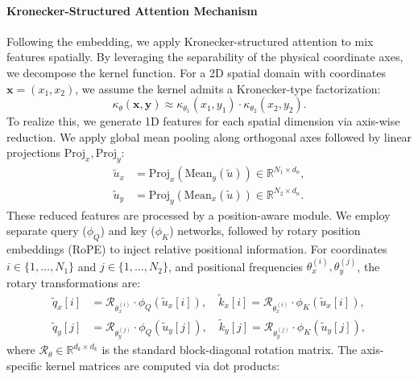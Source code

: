 \documentclass[final,3p,times]{elsarticle}
\begin{document}
\paragraph{Kronecker-Structured Attention Mechanism}
Following the embedding, we apply Kronecker-structured attention to mix features spatially. By leveraging the separability of the physical coordinate axes, we decompose the kernel function. For a 2D spatial domain with coordinates $\mathbf{x} = (x_1, x_2)$, we assume the kernel admits a Kronecker-type factorization:
\begin{equation}
\kappa_{\theta}(\mathbf{x}, \mathbf{y}) \approx \kappa_{\theta_1}(x_1, y_1) \cdot \kappa_{\theta_2}(x_2, y_2).
\label{eq:kronecker_kernel}
\end{equation}
To realize this, we generate 1D features for each spatial dimension via axis-wise reduction. We apply global mean pooling along orthogonal axes followed by linear projections $\text{Proj}_x, \text{Proj}_y$:
\begin{equation}
\begin{aligned}
\tilde{u}_{x}  &= \text{Proj}_x\left(\text{Mean}_{y}(\tilde{u})\right) \in \mathbb{R}^{N_1 \times d_{n}}, \\
\tilde{u}_{y}  &= \text{Proj}_y\left(\text{Mean}_{x}(\tilde{u})\right) \in \mathbb{R}^{N_2 \times d_{n}}.
\end{aligned}
\label{eq:axis_contraction}
\end{equation}
These reduced features are processed by a position-aware module. We employ separate query ($\phi_Q$) and key ($\phi_K$) networks, followed by rotary position embeddings (RoPE) \cite{su2024roformer} to inject relative positional information. For coordinates $i \in \{1, \dots, N_1\}$ and $j \in \{1, \dots, N_2\}$, and positional frequencies $\theta_x^{(i)}, \theta_y^{(j)}$, the rotary transformations are:
\begin{equation}
\begin{aligned}
\tilde{q}_x[i]  &= \mathcal{R}_{\theta_x^{(i)}} \cdot \phi_Q\left(\tilde{u}_x[i]\right), \quad \tilde{k}_x[i]  = \mathcal{R}_{\theta_x^{(i)}} \cdot \phi_K\left(\tilde{u}_x[i]\right), \\
\tilde{q}_y[j]  &= \mathcal{R}_{\theta_y^{(j)}} \cdot \phi_Q\left(\tilde{u}_y[j]\right), \quad \tilde{k}_y[j]  = \mathcal{R}_{\theta_y^{(j)}} \cdot \phi_K\left(\tilde{u}_y[j]\right),
\end{aligned}
\label{eq:rope_transformation}
\end{equation}
where $\mathcal{R}_{\theta} \in \mathbb{R}^{d_k \times d_k}$ is the standard block-diagonal rotation matrix. The axis-specific kernel matrices are computed via dot products:
\end{document}
